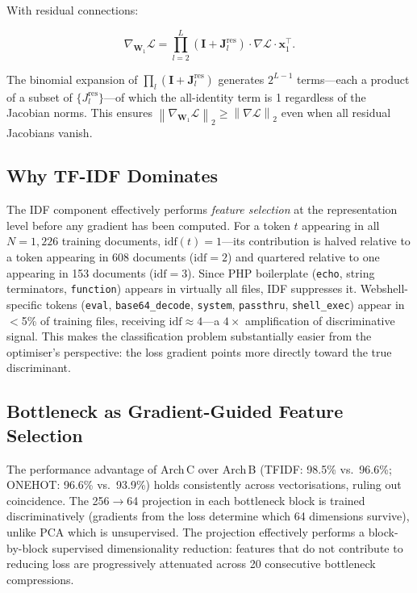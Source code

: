 \documentclass[10pt,conference,letterpaper]{IEEEtran}
\newcommand{\norm}[1]{\left\lVert#1\right\rVert}
\begin{document}
With residual connections:
\begin{tcolorbox}[eqbox]
\[
  \nabla_{\bm{W}_1}\mathcal{L}
  = \prod_{l=2}^{L}(\bm{I}+\bm{J}_l^\text{res})\cdot\nabla\mathcal{L}\cdot\bm{x}_1^\top.
\]
\end{tcolorbox}
The binomial expansion of $\prod_l(\bm{I}+\bm{J}_l^\text{res})$ generates $2^{L-1}$
terms---each a product of a subset of $\{J_l^\text{res}\}$---of which the
all-identity term is 1 regardless of the Jacobian norms. This ensures
$\norm{\nabla_{\bm{W}_1}\mathcal{L}}_2\ge\norm{\nabla\mathcal{L}}_2$
even when all residual Jacobians vanish.

\subsection{Why TF-IDF Dominates}

The IDF component effectively performs \emph{feature selection} at the
representation level before any gradient has been computed. For a token $t$
appearing in all $N=1{,}226$ training documents, $\mathrm{idf}(t)=1$---its
contribution is halved relative to a token appearing in 608 documents
($\mathrm{idf}=2$) and quartered relative to one appearing in 153 documents
($\mathrm{idf}=3$). Since PHP boilerplate (\texttt{echo}, string terminators,
\texttt{function}) appears in virtually all files, IDF suppresses it.
Webshell-specific tokens (\texttt{eval}, \texttt{base64\_decode},
\texttt{system}, \texttt{passthru}, \texttt{shell\_exec}) appear in $<$5\% of
training files, receiving $\mathrm{idf}\approx 4$---a $4\times$ amplification
of discriminative signal. This makes the classification problem substantially
easier from the optimiser's perspective: the loss gradient points more directly
toward the true discriminant.

\subsection{Bottleneck as Gradient-Guided Feature Selection}

The performance advantage of Arch\,C over Arch\,B (TFIDF: 98.5\% vs.\
96.6\%; ONEHOT: 96.6\% vs.\ 93.9\%) holds consistently across vectorisations,
ruling out coincidence. The 256$\to$64 projection in each bottleneck block is
trained discriminatively (gradients from the loss determine which 64 dimensions
survive), unlike PCA which is unsupervised. The projection effectively performs
a block-by-block supervised dimensionality reduction: features that do not
contribute to reducing loss are progressively attenuated across 20 consecutive
bottleneck compressions.
\end{document}
